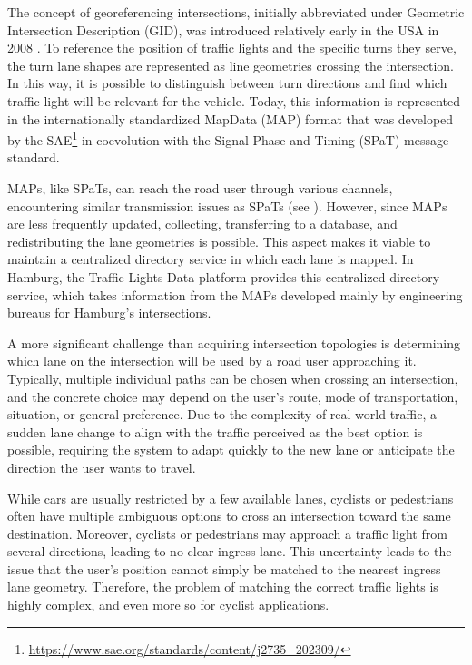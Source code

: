 The concept of georeferencing intersections, initially abbreviated under Geometric Intersection Description (GID), was introduced relatively early in the USA in 2008 \cite{cicas-v}. To reference the position of traffic lights and the specific turns they serve, the turn lane shapes are represented as line geometries crossing the intersection. In this way, it is possible to distinguish between turn directions and find which traffic light will be relevant for the vehicle. Today, this information is represented in the internationally standardized MapData (MAP) format that was developed by the SAE\footnote{\url{https://www.sae.org/standards/content/j2735_202309/}} in coevolution with the Signal Phase and Timing (SPaT) message standard.

MAPs, like SPaTs, can reach the road user through various channels, encountering similar transmission issues as SPaTs (see ). However, since MAPs are less frequently updated, collecting, transferring to a database, and redistributing the lane geometries is possible. This aspect makes it viable to maintain a centralized directory service in which each lane is mapped. In Hamburg, the Traffic Lights Data platform provides this centralized directory service, which takes information from the MAPs developed mainly by engineering bureaus for Hamburg's intersections.

A more significant challenge than acquiring intersection topologies is determining which lane on the intersection will be used by a road user approaching it. Typically, multiple individual paths can be chosen when crossing an intersection, and the concrete choice may depend on the user's route, mode of transportation, situation, or general preference. Due to the complexity of real-world traffic, a sudden lane change to align with the traffic perceived as the best option is possible, requiring the system to adapt quickly to the new lane or anticipate the direction the user wants to travel. 

While cars are usually restricted by a few available lanes, cyclists or pedestrians often have multiple ambiguous options to cross an intersection toward the same destination. Moreover, cyclists or pedestrians may approach a traffic light from several directions, leading to no clear ingress lane. This uncertainty leads to the issue that the user's position cannot simply be matched to the nearest ingress lane geometry. Therefore, the problem of matching the correct traffic lights is highly complex, and even more so for cyclist applications.

